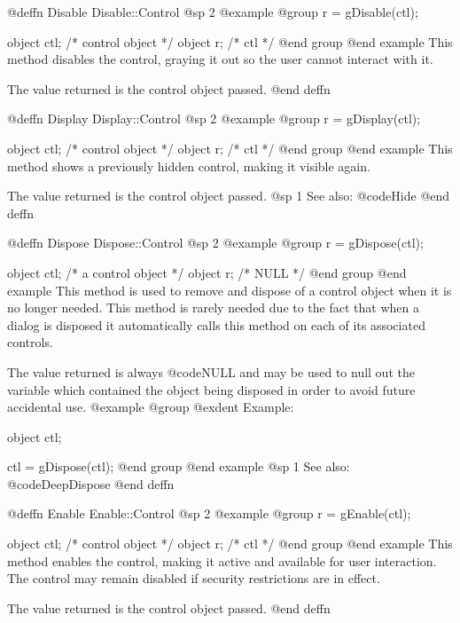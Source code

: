 @deffn {Disable} Disable::Control
@sp 2
@example
@group
r = gDisable(ctl);

object  ctl;   /*  control object  */
object  r;     /*  ctl             */
@end group
@end example
This method disables the control, graying it out so the user cannot
interact with it.

The value returned is the control object passed.
@end deffn



@deffn {Display} Display::Control
@sp 2
@example
@group
r = gDisplay(ctl);

object  ctl;   /*  control object  */
object  r;     /*  ctl             */
@end group
@end example
This method shows a previously hidden control, making it visible again.

The value returned is the control object passed.
@sp 1
See also:  @code{Hide}
@end deffn



@deffn {Dispose} Dispose::Control
@sp 2
@example
@group
r = gDispose(ctl);

object  ctl;   /*  a control object  */
object  r;     /*  NULL              */
@end group
@end example
This method is used to remove and dispose of a control object when it
is no longer needed.  This method is rarely needed due to the fact that
when a dialog is disposed it automatically calls this method on each of
its associated controls.

The value returned is always @code{NULL} and may be used to null out
the variable which contained the object being disposed in order to
avoid future accidental use.
@example
@group
@exdent Example:

object  ctl;

ctl = gDispose(ctl);
@end group
@end example
@sp 1
See also:  @code{DeepDispose}
@end deffn














@deffn {Enable} Enable::Control
@sp 2
@example
@group
r = gEnable(ctl);

object  ctl;   /*  control object  */
object  r;     /*  ctl             */
@end group
@end example
This method enables the control, making it active and available for user
interaction.  The control may remain disabled if security restrictions
are in effect.

The value returned is the control object passed.
@end deffn



